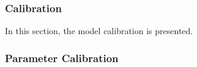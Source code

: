 \documentclass[
thesis.tex
]{subfiles}
\begin{document}
\newpage

\subsubsection{Calibration}\label{sec:calibration}


In this section, the model calibration is presented.

\subsubsection*{Parameter Calibration}

\vspace*{0.5cm}
\end{document}
